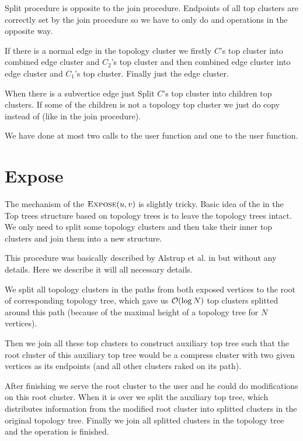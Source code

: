 Split procedure is opposite to the join procedure. Endpoints of all top clusters
are correctly set by the join procedure so we have to only do \Split{} and
\Destroy{} operations in the opposite way.

If there is a normal edge in the topology cluster we firstly \Split{} $C$'s
{\I top cluster} into {\I combined edge cluster} and $C_2$'s {\I top cluster}
and then \Split{} {\I combined edge cluster} into {\I edge cluster} and $C_1$'s
{\I top cluster}. Finally just \Destroy{} the {\I edge cluster}.

When there is a subvertice edge just Split $C$'s {\I top cluster} into children
{\I top clusters}. If some of the children is not a topology top cluster we just
do copy instead of \Split{} (like in the join procedure).

We have done at most two calls to the \Split{} user function and one to the
\Create{} user function.


\section{Expose}

The mechanism of the $\hbox{\sc Expose}(u,v)$ is slightly tricky. Basic idea of the
\Expose{} in the Top trees structure based on topology trees is to leave the
topology trees intact. We only need to split some topology clusters and then
take their inner top clusters and join them into a new structure.

This procedure was basically described by Alstrup et al. in \cite{TopTrees} but
without any details. Here we describe it will all necessary details.

We split all topology clusters in the paths from both exposed vertices to the
root of corresponding topology tree, which gave us ${\cal O}(\log N)$ top clusters
splitted around this path (because of the maximal height of a topology tree for
$N$ vertices).

Then we join all these top clusters to construct {\I auxiliary top tree} such
that the root cluster of this auxiliary top tree would be a compress cluster
with two given vertices as its endpoints (and all other clusters raked on its
path).

After finishing \Expose{} we serve the root cluster to the user and he could do
modifications on this root cluster. When it is over we split the auxiliary top
tree, which distributes information from the modified root cluster into splitted
clusters in the original topology tree. Finally we join all splitted clusters
in the topology tree and the operation is finished.

